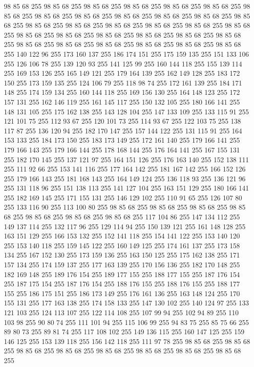 98 85 68 255 98 85 68 255 98 85 68 255 98 85 68 255 98 85 68 255 98 85 68 255 98 85 68 255 98 85 68 255 98 85 68 255 98 85 68 255 98 85 68 255 98 85 68 255 98 85 68 255 98 85 68 255 98 85 68 255 98 85 68 255 98 85 68 255 98 85 68 255 98 85 68 255 98 85 68 255 98 85 68 255 98 85 68 255 98 85 68 255 98 85 68 255 98 85 68 255 98 85 68 255 98 85 68 255 98 85 68 255 98 85 68 255 98 85 68 255 98 85 68 255 140 122 96 255 173 160 137 255 186 174 151 255 175 159 135 255 151 133 106 255 126 106 78 255 139 120 93 255 141 125 99 255 160 144 118 255 155 139 114 255 169 153 126 255 165 149 121 255 179 164 139 255 162 149 128 255 183 172 150 255 173 159 135 255 124 106 79 255 118 98 74 255 172 161 139 255 184 171 148 255 174 159 134 255 160 144 118 255 169 156 130 255 164 148 123 255 172 157 131 255 162 146 119 255 161 145 117 255 150 132 105 255 180 166 141 255 148 131 105 255 175 162 138 255 143 128 104 255 147 133 109 255
133 115 91 255 121 101 75 255 112 93 67 255 120 101 73 255 114 93 67 255 122 103 75 255 138 117 87 255 136 120 94 255 182 170 147 255 157 144 122 255 131 115 91 255 164 153 133 255 184 173 150 255 183 173 149 255 172 161 140 255 179 166 141 255 179 166 143 255 179 166 144 255 178 168 144 255 176 164 141 255 167 155 131 255 182 170 145 255 137 121 97 255 164 151 126 255 176 163 140 255 152 138 111 255 111 92 66 255 153 141 116 255 177 164 142 255 181 167 142 255 166 152 126 255 179 166 143 255 181 168 143 255 164 149 124 255 136 118 93 255 136 121 96 255 131 118 96 255 151 138 113 255 141 127 104 255 163 151 129 255 180 166 141 255 182 169 145 255 171 155 131 255 146 129 102 255 110 91 65 255 126 107 80 255 133 116 90 255 113 100 80 255 98 85 68 255 98 85 68 255 98 85 68 255 98 85 68 255 98 85 68 255 98 85 68 255 98 85 68 255 117 104 86 255 147 134 112 255 149 137 114 255 132 117 96 255 129 114 94 255 150 139 121 255 161 148 128 255 163 151 129 255 166 153 132 255
152 141 118 255 154 141 122 255 153 140 120 255 153 140 118 255 159 145 122 255 160 149 125 255 174 161 137 255 173 158 134 255 167 152 130 255 173 159 136 255 163 150 125 255 175 162 138 255 171 157 134 255 174 159 137 255 177 163 139 255 170 156 136 255 182 170 148 255 182 169 148 255 189 176 154 255 189 177 155 255 188 177 155 255 187 176 154 255 187 175 154 255 187 176 154 255 188 176 155 255 188 176 155 255 188 177 155 255 186 175 151 255 186 173 149 255 176 161 136 255 163 148 124 255 170 155 131 255 177 163 138 255 174 158 133 255 147 130 102 255 140 124 97 255 133 121 103 255 124 113 107 255 122 114 108 255 107 99 94 255 102 94 89 255 110 103 98 255 90 80 74 255 111 101 94 255 115 106 99 255 94 83 75 255 85 75 66 255 89 80 73 255 89 81 74 255 117 108 102 255 149 136 115 255 160 147 125 255 159 146 125 255 153 139 118 255 156 142 118 255 111 97 78 255 98 85 68 255 98 85 68 255 98 85 68 255 98 85 68 255 98 85 68 255 98 85 68 255 98 85 68 255 98 85 68 255
